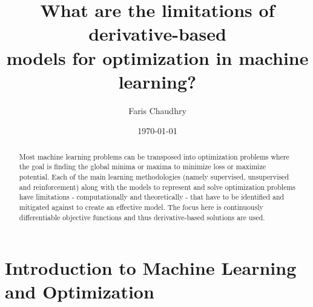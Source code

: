 \documentclass[10pt,a4paper]{report}
\title{What are the limitations of derivative-based \\
	   models for optimization in machine learning?}
\author{Faris Chaudhry}
\date{\today}
\newcommand\frontmatter{
	\cleardoublepage
	\pagenumbering{roman}}
\newcommand\mainmatter{
	\cleardoublepage
	\pagenumbering{arabic}}
\begin{document}
	\frontmatter
	\maketitle

	\begin{abstract}
		Most machine learning problems can be transposed into optimization problems
		where the goal is finding the global minima or maxima to minimize loss or maximize potential.
		Each of the main learning methodologies (namely supervised, unsupervised and reinforcement)
		along with the models to represent and solve optimization problems have limitations -
		computationally and theoretically - that have to be identified and mitigated against
		to create an effective model. The focus here is continuously differentiable objective functions
		and thus derivative-based solutions are used.
	\end{abstract}

	\tableofcontents
	\mainmatter

    \chapter{Introduction to Machine Learning and Optimization}
\end{document}
